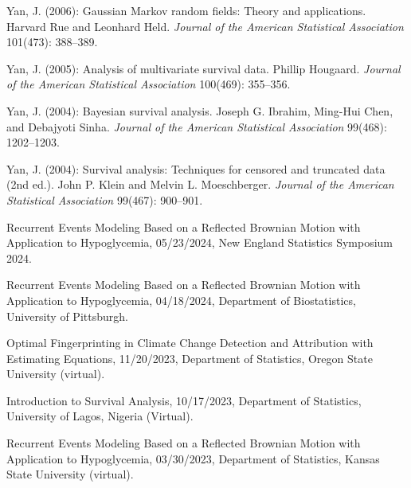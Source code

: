 \documentclass[Statistics]{vita}
\begin{document}
\begin{vita}
\begin{Publications}
\begin{NonRefereedPublications}
  \end{NonRefereedPublications}
  \begin{BookReviews}
  \item Yan, J. (2006): Gaussian Markov random fields: Theory and applications. {H}arvard {R}ue and {L}eonhard {H}eld. {\em Journal of the American Statistical Association\/} 101(473): 388--389.
  \item Yan, J. (2005): Analysis of multivariate survival data. {P}hillip {H}ougaard. {\em Journal of the American Statistical Association\/} 100(469): 355--356.
  \item Yan, J. (2004): Bayesian survival analysis. {J}oseph {G}. {I}brahim, {M}ing-{H}ui {C}hen, and {D}ebajyoti {S}inha. {\em Journal of the American Statistical Association\/} 99(468): 1202--1203.
  \item Yan, J. (2004): Survival analysis: Techniques for censored and truncated data (2nd ed.). {J}ohn {P}. {K}lein and {M}elvin {L}. {M}oeschberger. {\em Journal of the American Statistical Association\/} 99(467): 900--901.
  \end{BookReviews}
  \end{Publications}
  \begin{InvitedTalks}
  \item Recurrent Events Modeling Based on a Reflected Brownian Motion with Application to Hypoglycemia, 05/23/2024, New England Statistics Symposium 2024.
  \item Recurrent Events Modeling Based on a Reflected Brownian Motion with Application to Hypoglycemia, 04/18/2024, Department of Biostatistics, University of Pittsburgh.
  \item Optimal Fingerprinting in Climate Change Detection and Attribution with Estimating Equations, 11/20/2023, Department of Statistics, Oregon State University (virtual).
  \item Introduction to Survival Analysis, 10/17/2023, Department of Statistics, University of Lagos, Nigeria (Virtual).
  \item Recurrent Events Modeling Based on a Reflected Brownian Motion with Application to Hypoglycemia, 03/30/2023, Department of Statistics, Kansas State University (virtual).

\end{InvitedTalks}
\end{vita}
\end{document}
